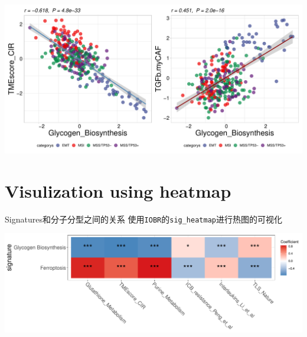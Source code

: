 \documentclass[
  12pt,
]{book}
\newenvironment{Shaded}{\begin{snugshade}}{\end{snugshade}}
\newcommand{\AttributeTok}[1]{\textcolor[rgb]{0.13,0.29,0.53}{#1}}
\newcommand{\DecValTok}[1]{\textcolor[rgb]{0.00,0.00,0.81}{#1}}
\newcommand{\FunctionTok}[1]{\textcolor[rgb]{0.13,0.29,0.53}{\textbf{#1}}}
\newcommand{\NormalTok}[1]{#1}
\newcommand{\OtherTok}[1]{\textcolor[rgb]{0.56,0.35,0.01}{#1}}
\newcommand{\SpecialCharTok}[1]{\textcolor[rgb]{0.81,0.36,0.00}{\textbf{#1}}}
\newcommand{\StringTok}[1]{\textcolor[rgb]{0.31,0.60,0.02}{#1}}
\theoremstyle{definition}
\theoremstyle{definition}
\theoremstyle{definition}
\theoremstyle{definition}
\theoremstyle{remark}
\begin{document}
\begin{center}\includegraphics{_main_files/figure-latex/unnamed-chunk-45-1} \end{center}

\hypertarget{visulization-using-heatmap}{%
\section{Visulization using heatmap}\label{visulization-using-heatmap}}

Signatures和分子分型之间的关系
使用\texttt{IOBR}的\texttt{sig\_heatmap}进行热图的可视化

\begin{Shaded}
\end{Shaded}

\begin{center}\includegraphics{_main_files/figure-latex/unnamed-chunk-46-1} \end{center}
\end{document}
